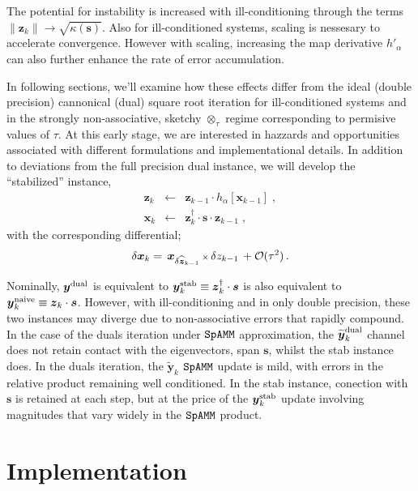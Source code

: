 \documentclass[letterpaper,twocolumn,amsmath,amsfont,amssymb,english,aps,jcp,preprintnumbers,groupaddress,nofootinbib,tightenlines,floatfix]{revtex4}
\newcommand{\mat}[1]{\boldsymbol{#1}}
\newcommand{\ot}{  {\scriptstyle \otimes}_{ \tau } }
\theoremstyle{plain}
\theoremstyle{remark}
\theoremstyle{plain}
\begin{document}
The potential for
instability is increased with ill-conditioning through the terms $\lVert \mat{z}_{k} \rVert  \rightarrow \sqrt{\kappa\left(\mat{s} \right)}$.
Also for ill-conditioned systems, scaling is nessesary to accelerate convergence.  However with scaling, increasing the map 
derivative $h'_\alpha$ can also further enhance the rate of error accumulation. 

In following sections, we'll examine how these effects differ from the ideal (double precision) cannonical (dual) square root iteration
for ill-conditioned systems and in the strongly non-associative, sketchy $\ot$ regime corresponding to permisive values of $\tau$.
At this early stage, we are interested in hazzards and opportunities associated with
different formulations and implementational details.   In addition to deviations from the full precision dual instance,
we will develop the  ``stabilized'' instance,
\begin{eqnarray}\label{stabilized}
\mat{z}_k &\leftarrow& \mat{z}_{k-1} \cdot h_\alpha \left[ \mat{x}_{k-1} \right] \; , \nonumber \\
\mat{x}_k &\leftarrow&  \mat{z}^\dagger_{k} \cdot \mat{s} \cdot \mat{z}_{k-1} \; ,
\end{eqnarray}
with the corresponding differential;
\begin{equation} \label{firstorderstab}
\delta \mat{x}_k = \,  { \mat{x}}_{\delta \widehat{\mat{z}}_{k-1}}  \, {\scriptstyle \times} \, \delta z_{k-1}  \, + {\cal O}(\tau^2)  \, .
\end{equation}

Nominally, $\mat{y}^{\rm dual}$ is equivalent to $\mat{y}^{\rm stab}_k \equiv \mat{z}^\dagger_{k} \cdot \mat{s}$ 
is also equivalent to $\mat{y}^{\rm naive}_k \equiv \mat{z}_{k} \cdot \mat{s}$.
However, with ill-conditioning and in only double precision, these two instances may diverge due to non-associative errors that rapidly compound.
In the case of the duals iteration under $\tt SpAMM$ approximation, the $\widetilde{\mat{y}}^{\rm dual}_k$ channel does not retain contact 
with the eigenvectors, span $\mat{s}$, whilst the stab instance does.  
In the duals iteration, the $\widetilde{\mat{y}}_k$  $\tt SpAMM$ update 
is mild, with errors in the relative product remaining well conditioned.  
In the stab instance, conection with $\mat{s}$ is retained at each step, but at the price of the 
$\mat{y}^{\rm stab}_k$ update involving magnitudes that vary widely in the $\tt SpAMM$ product.     


\section{Implementation}
\end{document}
